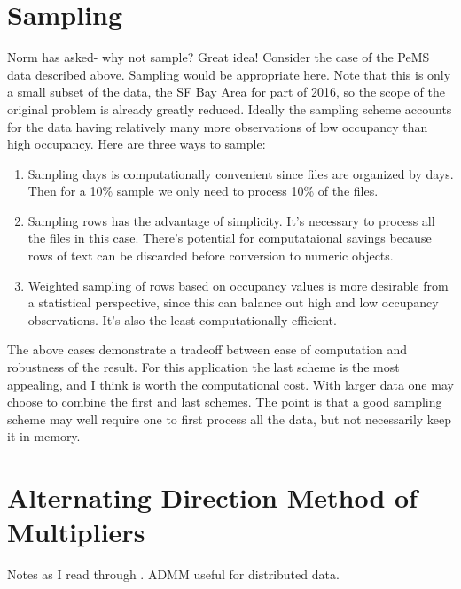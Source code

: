 \documentclass[12pt]{article}
\begin{document}
\section{Sampling}

Norm has asked- why not sample? Great idea! Consider the case of the PeMS
data described above. Sampling would be appropriate here. Note that
this is only a small subset of the data, the SF Bay Area for part of 2016,
so the scope of the original problem is already greatly reduced. 
Ideally the sampling scheme accounts for the data having relatively many
more observations of low occupancy than high occupancy. 
Here are three ways to sample:

\begin{enumerate}

    \item Sampling days is computationally convenient since files are
        organized by days. Then for a 10\% sample we only need to process
        10\% of the files. 

    \item Sampling rows has the advantage of simplicity. It's necessary to
        process all the files in this case. There's potential for
        computataional savings because rows of text can be discarded
        before conversion to numeric objects.

    \item Weighted sampling of rows based on occupancy values is more
        desirable from a statistical perspective, since this can balance
        out high and low occupancy observations.  It's also the least
        computationally efficient.

\end{enumerate}

The above cases demonstrate a tradeoff between ease of computation and
robustness of the result. For this application the last
scheme is the most appealing, and I think is worth the computational cost.
With larger data one may choose to combine the first and last schemes.  The
point is that a good sampling scheme may well require one to first process
all the data, but not necessarily keep it in memory.


\section{Alternating Direction Method of Multipliers}

Notes as I read through \cite{boyd2011distributed}. ADMM useful for distributed
data.
\end{document}
